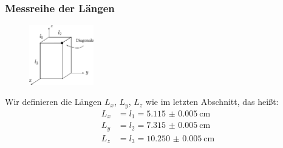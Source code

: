        \subsubsection{Messreihe der Längen}
            \begin{figure}
                \begin{center}
                    \vspace{-3em}
                    \includegraphics[width=0.25\textwidth]{cube.pdf}
                    \vspace{-3em}
                \end{center}
            \end{figure}
            Wir definieren die Längen $L_x$, $L_y$, $L_z$ wie im letzten Abschnitt, das heißt:
            \begin{align*}
                L_x &= l_1 = \SI{5.115(5)}{\centi\meter}  \\
                L_y &= l_2 = \SI{7.315(5)}{\centi\meter}  \\
                L_z &= l_3 = \SI{10.250(5)}{\centi\meter}
            \end{align*} 
